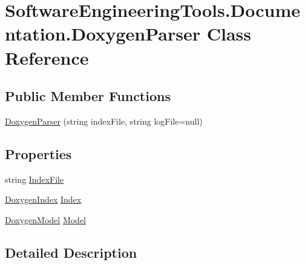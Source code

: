 \hypertarget{class_software_engineering_tools_1_1_documentation_1_1_doxygen_parser}{\section{Software\+Engineering\+Tools.\+Documentation.\+Doxygen\+Parser Class Reference}
\label{class_software_engineering_tools_1_1_documentation_1_1_doxygen_parser}
}
\subsection*{Public Member Functions}
\begin{DoxyCompactItemize}
\item 
\hyperlink{class_software_engineering_tools_1_1_documentation_1_1_doxygen_parser_ade05bc6069a11bd0e2368e9eadbbe30a}{Doxygen\+Parser} (string index\+File, string log\+File=null)
\end{DoxyCompactItemize}
\subsection*{Properties}
\begin{DoxyCompactItemize}
\item 
string \hyperlink{class_software_engineering_tools_1_1_documentation_1_1_doxygen_parser_abfeef404cab333dbfa1602536f94c4e7}{Index\+File}
\item 
\hyperlink{class_software_engineering_tools_1_1_documentation_1_1_doxygen_index}{Doxygen\+Index} \hyperlink{class_software_engineering_tools_1_1_documentation_1_1_doxygen_parser_a0b088e4a6affa57fa82d10bf05730c6b}{Index}
\item 
\hyperlink{class_software_engineering_tools_1_1_documentation_1_1_doxygen_model}{Doxygen\+Model} \hyperlink{class_software_engineering_tools_1_1_documentation_1_1_doxygen_parser_ab197aca4cd631c97157434f374cc40d6}{Model}
\end{DoxyCompactItemize}


\subsection{Detailed Description}


